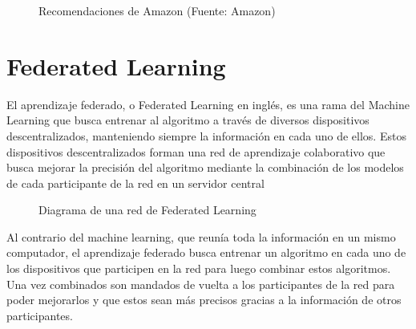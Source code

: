 \begin{figure}[thbp]
    \centering
    \caption{Recomendaciones de Amazon (Fuente: Amazon\autocite{AmazonEsCompra})} 
    \label{fig:AmazonRecomendaciones}
\end{figure}

\section{Federated Learning}
El aprendizaje federado, o Federated Learning en inglés, es una rama del Machine Learning que busca entrenar al algoritmo a través de diversos dispositivos descentralizados, manteniendo siempre la información en cada uno de ellos. Estos dispositivos descentralizados forman una red de aprendizaje colaborativo que busca mejorar la precisión del algoritmo mediante la combinación de los modelos de cada participante de la red en un servidor central

\begin{figure}[thbp]
    \centering
    \caption{Diagrama de una red de Federated Learning} 
    \label{fig:FedLearArquitectura}
\end{figure}
Al contrario del machine learning, que reunía toda la información en un mismo computador, el aprendizaje federado busca entrenar un algoritmo en cada uno de los dispositivos que participen en la red para luego combinar estos algoritmos. Una vez combinados son mandados de vuelta a los participantes de la red para poder mejorarlos y que estos sean más precisos gracias a la información de otros participantes.